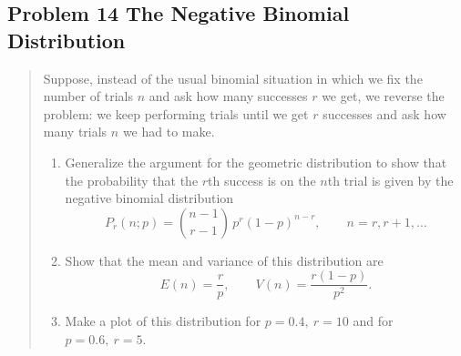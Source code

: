 \documentclass[10pt]{article}
\begin{document}

\subsection*{Problem 14 The Negative Binomial Distribution}
\begin{quote}
	Suppose, instead of the usual binomial situation in which we fix the number of trials $n$ and ask how many successes $r$ we get, we reverse the problem: we keep performing trials until we get $r$ successes and ask how many trials $n$ we had to make.
	\begin{enumerate}[label=(\alph*)]
		\item Generalize the argument for the geometric distribution to show that the probability that the $r$th success is on the $n$th trial is given by the negative binomial distribution
		      \[
			      P_r(n;p) = {n-1 \choose r-1}\, p^r (1-p)^{n-r}, \qquad n=r, r+1,\ldots
		      \]

		\item Show that the mean and variance of this distribution are
		      \[
			      E(n)=\frac{r}{p}, \qquad V(n)=\frac{r(1-p)}{p^2}.
		      \]
		\item Make a plot of this distribution for $p=0.4,\ r=10$ and for $p=0.6,\ r=5$.
	\end{enumerate}
\end{quote}

\divider
\end{document}
